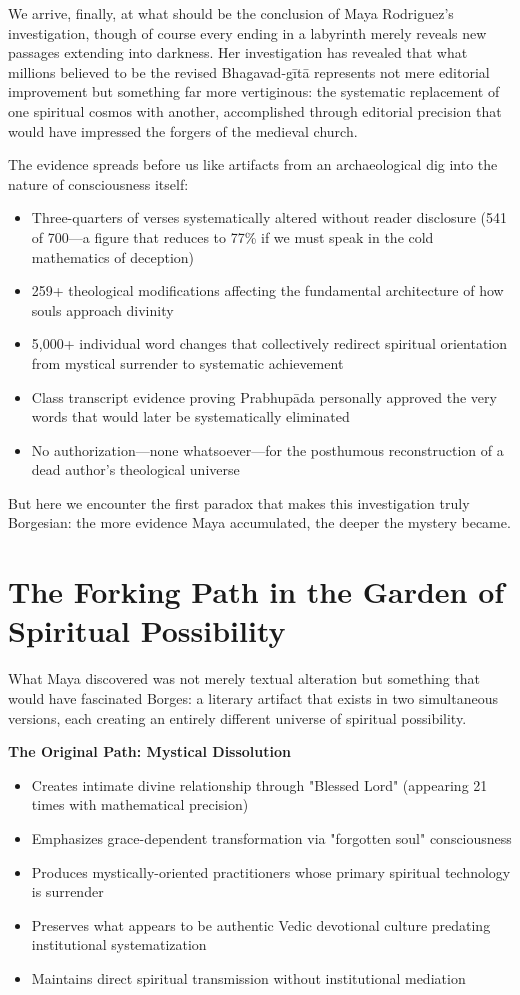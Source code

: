 \documentclass[11pt,twoside]{book}
\begin{document}
We arrive, finally, at what should be the conclusion of Maya Rodriguez's investigation, though of course every ending in a labyrinth merely reveals new passages extending into darkness. Her investigation has revealed that what millions believed to be the revised Bhagavad-gītā represents not mere editorial improvement but something far more vertiginous: the systematic replacement of one spiritual cosmos with another, accomplished through editorial precision that would have impressed the forgers of the medieval church.

The evidence spreads before us like artifacts from an archaeological dig into the nature of consciousness itself:

\begin{itemize}
\item Three-quarters of verses systematically altered without reader disclosure (541 of 700—a figure that reduces to 77\% if we must speak in the cold mathematics of deception)
\item 259+ theological modifications affecting the fundamental architecture of how souls approach divinity
\item 5,000+ individual word changes that collectively redirect spiritual orientation from mystical surrender to systematic achievement
\item Class transcript evidence proving Prabhupāda personally approved the very words that would later be systematically eliminated
\item No authorization—none whatsoever—for the posthumous reconstruction of a dead author's theological universe
\end{itemize}

But here we encounter the first paradox that makes this investigation truly Borgesian: the more evidence Maya accumulated, the deeper the mystery became.
\section*{The Forking Path in the Garden of Spiritual Possibility}
\label{sec:org3d3f742}

What Maya discovered was not merely textual alteration but something that would have fascinated Borges: a literary artifact that exists in two simultaneous versions, each creating an entirely different universe of spiritual possibility.

\textbf{\textbf{The Original Path: Mystical Dissolution}}
\begin{itemize}
\item Creates intimate divine relationship through "Blessed Lord" (appearing 21 times with mathematical precision)
\item Emphasizes grace-dependent transformation via "forgotten soul" consciousness
\item Produces mystically-oriented practitioners whose primary spiritual technology is surrender
\item Preserves what appears to be authentic Vedic devotional culture predating institutional systematization
\item Maintains direct spiritual transmission without institutional mediation
\end{itemize}
\end{document}
